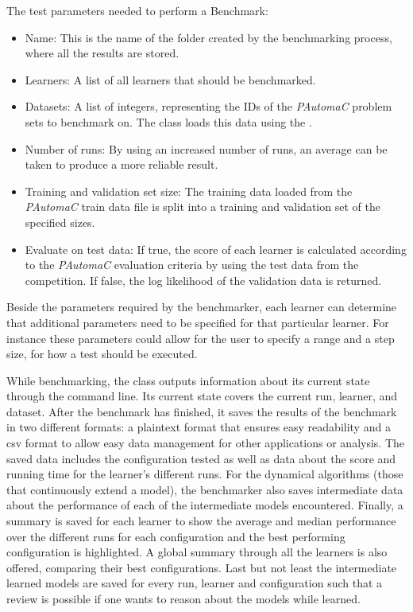 The test parameters needed to perform a Benchmark:

\begin{itemize}
	\item[] Name: This is the name of the folder created by the benchmarking process, where all the results are stored.
	\item[] Learners: A list of all learners that should be benchmarked.
	\item[] Datasets: A list of integers, representing the IDs of the \emph{PAutomaC} problem sets to benchmark on. The  class loads this data using the .
	\item[] Number of runs: By using an increased number of runs, an average can be taken to produce a more reliable result.
	\item[] Training and validation set size: The training data loaded from the \emph{PAutomaC} train data file is split into a training and validation set of the specified sizes.
	\item[] Evaluate on test data: If true, the score of each learner is calculated according to the \emph{PAutomaC} evaluation criteria by using the test data from the competition. If false, the log likelihood of the validation data is returned.
\end{itemize}

Beside the parameters required by the benchmarker, each learner can determine that additional parameters need to be specified for that particular learner. For instance these parameters could allow for the user to specify a range and a step size, for how a test should be executed.

While benchmarking, the  class outputs information about its current state through the command line. Its current state covers the current run, learner, and dataset. After the benchmark has finished, it saves the results of the benchmark in two different formats: a plaintext format that ensures easy readability and a \gls{csv} format to allow easy data management for other applications or analysis. The saved data includes the configuration tested as well as data about the score and running time for the learner's different runs. For the dynamical algorithms (those that continuously extend a model), the benchmarker also saves intermediate data about the performance of each of the intermediate models encountered. 
Finally, a summary is saved for each learner to show the average and median performance over the different runs for each configuration and the best performing configuration is highlighted. A global summary through all the learners is also offered, comparing their best configurations. Last but not least the intermediate learned models are saved for every run, learner and configuration such that a review is possible if one wants to reason about the models while learned.

